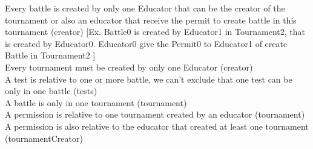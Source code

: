 \documentclass{article}
\begin{document}
{    Every battle is created by only one Educator that can be the creator of the tournament or also an educator that receive the permit to create battle in this tournament (creator) [Ex. Battle0 is created by Educator1 in Tournament2, that is created by Educator0. Educator0 give the Permit0 to Educator1 of create Battle in Tournament2 ]\\
    \color{green}
    Every tournament must be created by only one Educator (creator)\\
    \color{blue}
    A test is relative to one or more battle, we can't exclude that one test can be only in one battle (tests)\\
    \color{violet}
    A battle is only in one tournament (tournament)\\
    \color{red}
    A permission is relative to one tournament created by an educator (tournament)\\
    \color{brown}
    A permission is also relative to the educator that created at least one tournament (tournamentCreator)\\


}
\end{document}

